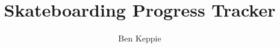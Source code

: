 \documentclass{report}
\begin{document}
\title{Skateboarding Progress Tracker}
\author{Ben Keppie}
\maketitle
\tableofcontents






\end{document}
